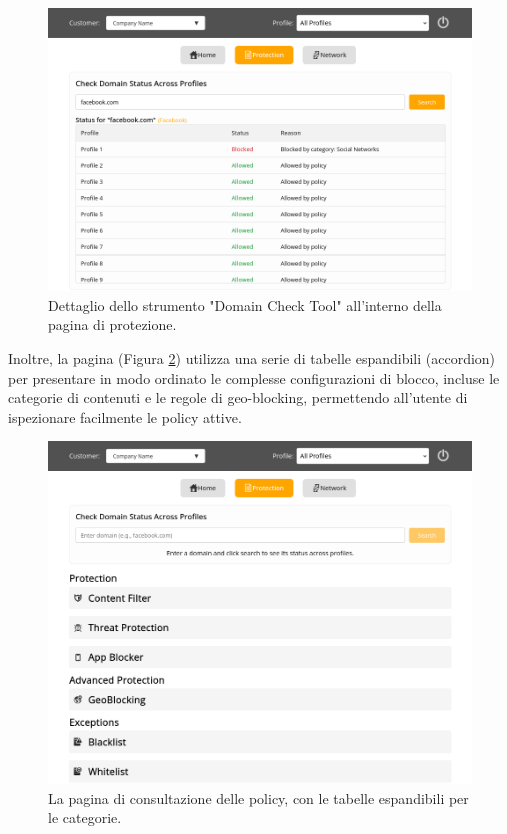 \documentclass[12pt,a4paper,openright,twoside]{book}
\begin{document}
\begin{figure}[htbp]
    \centering
    \includegraphics[width=\textwidth]{figures/domain.png}
    \caption{Dettaglio dello strumento "Domain Check Tool" all'interno della pagina di protezione.}
    \label{fig:protection_domain_check}
\end{figure}

\FloatBarrier

Inoltre, la pagina (Figura \ref{fig:protection_policies}) utilizza una serie di tabelle espandibili (accordion) per presentare in modo ordinato le complesse configurazioni di blocco, incluse le categorie di contenuti e le regole di geo-blocking, permettendo all'utente di ispezionare facilmente le policy attive.

\begin{figure}[htbp]
    \centering
    \includegraphics[width=\textwidth]{figures/protection.png}
    \caption{La pagina di consultazione delle policy, con le tabelle espandibili per le categorie.}
    \label{fig:protection_policies}
\end{figure}
\end{document}
